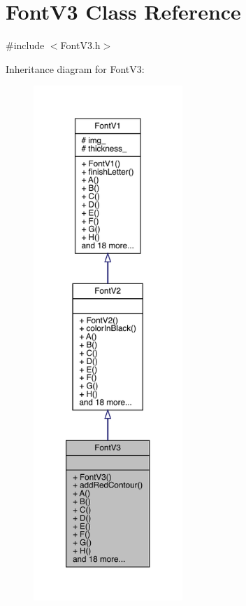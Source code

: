 \hypertarget{class_font_v3}{}\section{Font\+V3 Class Reference}
\label{class_font_v3}


{\ttfamily \#include $<$Font\+V3.\+h$>$}



Inheritance diagram for Font\+V3\+:\nopagebreak
\begin{figure}[H]
\begin{center}
\leavevmode
\includegraphics[height=550pt]{class_font_v3__inherit__graph}
\end{center}
\end{figure}


